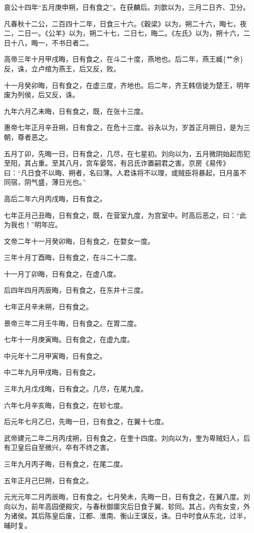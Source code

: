 \documentclass[]{article}
\begin{document}
哀公十四年``五月庚申朔，日有食之''。在获麟后。刘歆以为，三月二日齐、卫分。

凡春秋十二公，二百四十二年，日食三十六。《穀梁》以为，朔二十六，晦七，夜二，二日一。《公羊》以为，朔二十七，二日七，晦二。《左氏》以为，朔十六，二日十八，晦一，不书日者二。

高帝三年十月甲戌晦，日有食之，在斗二十度，燕地也。后二年，燕王臧\{艹佘\}反，诛，立卢绾为燕王，后又反，败。

十一月癸卯晦，日有食之，在虚三度，齐地也。后二年，齐王韩信徙为楚王，明年废为列侯，后又反，诛。

九年六月乙未晦，日有食之，既，在张十三度。

惠帝七年正月辛丑朔，日有食之，在危十三度。谷永以为，岁首正月朔日，是为三朝，尊者恶之。

五月丁卯，先晦一日，日有食之，几尽，在七星初。刘向以为，五月微阴始起而犯至阳，其占重。至其八月，宫车晏驾，有吕氏诈置嗣君之害。京房《易传》曰：``凡日食不以晦、朔者，名曰薄。人君诛将不以理，或贼臣将暴起，日月虽不同宿，阴气盛，薄日光也。''

高后二年六月丙戌晦，日有食之。

七年正月己丑晦，日有食之，既，在营室九度，为宫室中。时高后恶之，曰：``此为我也！''明年应。

文帝二年十一月癸卯晦，日有食之，在婺女一度。

三年十月丁酉晦，日有食之，在斗二十二度。

十一月丁卯晦，日有食之，在虚八度。

后四年四月丙辰晦，日有食之，在东井十三度。

七年正月辛未朔，日有食之。

景帝三年二月壬牛晦，日有食之。在胃二度。

七年十一月庚寅晦。日有食之，在虚九度。

中元年十二月甲寅晦，日有食之。

中二年九月甲戌晦，日有食之。

三年九月戊戌晦，日有食之。几尽，在尾九度。

六年七月辛亥晦，日有食之，在轸七度。

后元年七月乙巳，先晦一日，日有食之，在翼十七度。

武帝建元二年二月丙戌朔，日有食之，在奎十四度。刘向以为，奎为卑贼妇人，后有卫皇后自至微兴，卒有不终之害。

三年九月丙子晦，日有食之，在尾二度。

五年正月己巳朔，日有食之。

元光元年二月丙辰晦，日有食之。七月癸未，先晦一日，日有食之，在翼八度。刘向以为，前年高园便殿灾，与春秋御廪灾后日食于翼、轸同。其占，内有女变，外为诸侯。其后陈皇后废，江都、淮南、衡山王谋反，诛。日中时食从东北，过半，晡时复。
\end{document}
